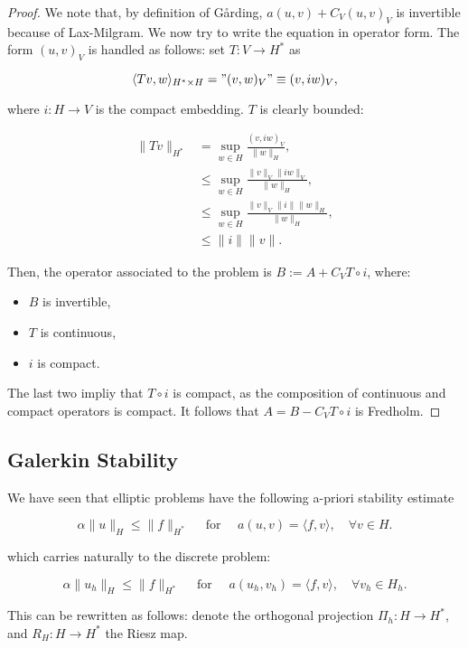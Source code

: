 \begin{proof}
    We note that, by definition of Gårding,  \(a(u,v) + C_V(u,v)_V\) is invertible because of Lax-Milgram. 
    We now try to write the equation in operator form. The form $(u,v)_V$ is handled as follows: set $T:V\to H^*$ as

    \[\langle Tv, w\rangle_{H^*\times H} = "(v,w)_V"\equiv (v,iw)_V,\]

    where $i: H\to V$ is the compact embedding. $T$ is clearly bounded:

    \begin{align*}
        \|Tv\|_{H^*} &= \sup_{w\in H}\frac{(v,iw)_V}{\|w\|_H},\\
        &\leq \sup_{w\in H}\frac{\|v\|_V\|iw\|_V}{\|w\|_H},\\
        &\leq \sup_{w\in H}\frac{\|v\|_V\|i\|\|w\|_H}{\|w\|_H},\\
        &\leq \|i\|\|v\|.
    \end{align*}

    Then, the operator associated to the problem is $B :=A + C_V T\circ i$, where:
    \begin{itemize}
        \item $B$ is invertible,
        \item $T$ is continuous,
        \item $i$ is compact. 
    \end{itemize}

    The last two impliy that $T\circ i$ is compact, as the composition of continuous and compact operators is compact. 
    It follows that $A = B - C_V T\circ i$ is Fredholm.
\end{proof}



\subsection{Galerkin Stability}

We have seen that elliptic problems have the following a-priori stability estimate

\[\alpha \|u\|_H \leq \|f\|_{H^*}\quad\text{ for }\quad a(u,v) = \langle f, v\rangle, \quad \forall v\in H.\]

which carries naturally to the discrete problem:

\[\alpha \|u_h\|_H \leq \|f\|_{H^*}\quad\text{ for }\quad a(u_h,v_h) = \langle f, v\rangle, \quad \forall v_h\in H_h.\]

This can be rewritten as follows: denote the orthogonal projection $\Pi_h: H\to H^*$, and $R_H:H\to H^*$ the Riesz map.

